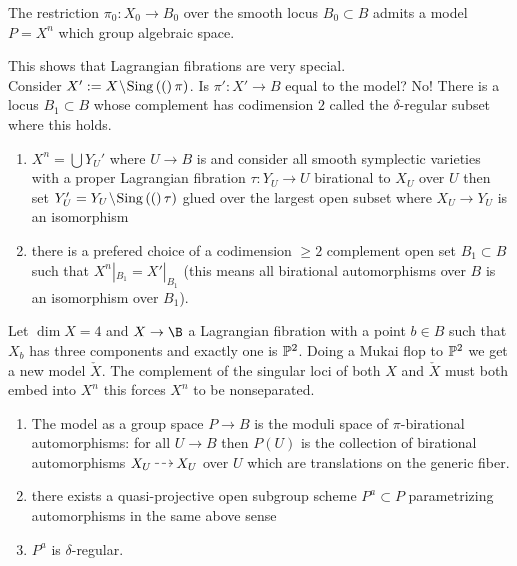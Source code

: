 \documentclass[12pt]{article}
\begin{document}
\begin{theorem}
The restriction $\pi_0 : X_0 \to B_0$ over the smooth locus $B_0 \subset B$ admits a \Neron model $P = X^n$ which group algebraic space.
\end{theorem}

This shows that Lagrangian fibrations are very special. 
\\
Consider $X' := X \sm \Sing(\pi)$. Is $\pi' : X' \to B$ equal to the \Neron model? No! There is a locus $B_1 \subset B$ whose complement has codimension $2$ called the $\delta$-regular subset where this holds. 

\begin{theorem}
\begin{enumerate}
\item $X^n = \bigcup Y_U'$ where $U \to B$ is \etale and consider all smooth symplectic varieties with a proper Lagrangian fibration $\tau : Y_U \to U$ birational to $X_U$ over $U$ then set $Y'_U = Y_U \sm \Sing(\tau)$ glued over the largest open subset where $X_U \to Y_U$ is an isomorphism
\item there is a prefered choice of a codimension $\ge 2$ complement open set $B_1 \subset B$ such that $X^n|_{B_1} = X'|_{B_1}$ (this means all birational automorphisms over $B$ is an isomorphism over $B_1$). 
\end{enumerate}
\end{theorem}

\begin{example}
Let $\dim{X} = 4$ and $X \to \B$ a Lagrangian fibration with a point $b \in B$ such that $X_b$ has three components and exactly one is $\P^2$. Doing a Mukai flop to $\P^2$ we get a new model $\check{X}$. The complement of the singular loci of both $X$ and $\check{X}$ must both embed into $X^n$ this forces $X^n$ to be nonseparated. 
\end{example}

\begin{theorem}
\begin{enumerate}
\item The \Neron model as a group space $P \to B$ is the moduli space of $\pi$-birational automorphisms: for all $U \to B$ \etale then $P(U)$ is the collection of birational automorphisms $X_U \rat X_U$ over $U$ which are translations on the generic fiber.  
\item there exists a quasi-projective open subgroup scheme $P^a \subset P$ parametrizing automorphisms in the same above sense
\item $P^a$ is $\delta$-regular.
\end{enumerate}
\end{theorem}
\end{document}
